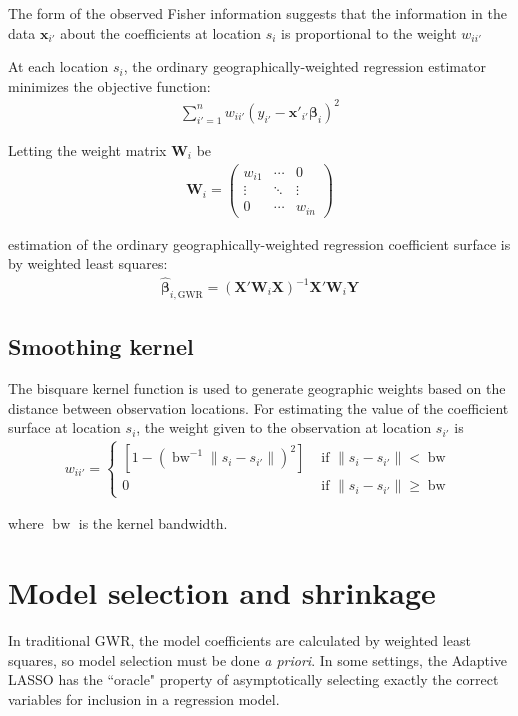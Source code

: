 \documentclass[authoryear, review, 11pt]{elsarticle}
\DeclareMathOperator*{\bw}{\mbox{bw}}
\begin{document}
	The form of the observed Fisher information suggests that the information in the data $\bm{x}_{i'}$ about the coefficients at location $s_i$ is proportional to the weight $w_{ii'}$
	
	At each location $s_i$, the ordinary geographically-weighted regression estimator minimizes the objective function:
	\begin{eqnarray}
		\sum_{i'=1}^n w_{ii'} \left(y_{i'} - \bm{x}'_{i'} \bm{\beta}_i \right)^2
	\end{eqnarray}
	
	Letting the weight matrix $\bm{W}_i$ be	
	\begin{eqnarray}
		\bm{W}_i =  \left( \begin{array}{ccc} w_{i1} & \cdots & 0 \\ \vdots & \ddots & \vdots \\ 0 & \cdots & w_{in} \end{array} \right)
	\end{eqnarray}
	
	estimation of the ordinary geographically-weighted regression coefficient surface is by weighted least squares:	
	\begin{eqnarray}
		\hat{\bm{\beta}}_{i, \mbox{GWR}} = \left( \bm{X}'\bm{W}_i\bm{X} \right)^{-1} \bm{X}'\bm{W}_i\bm{Y}
	\end{eqnarray}
	
	 
	 \subsection{Smoothing kernel}
	 	The bisquare kernel function is used to generate geographic weights based on the distance between observation locations. For estimating the value of the coefficient surface at location $s_i$, the weight given to the observation at location $s_{i'}$ is	
	\begin{eqnarray}
		w_{ii'} = \begin{cases} \left[ 1-\left( \bw^{-1} \|s_i-s_{i'}\| \right)^2 \right] & \mbox{ if } \|s_i-s_{i'}\| < \bw \\ 0 & \mbox{ if } \|s_i-s_{i'}\| \geq \bw \end{cases}
	\end{eqnarray}
	
	where $\bw$ is the kernel bandwidth.\\
	
\section{Model selection and shrinkage \label{section:method}}
	In traditional GWR, the model coefficients are calculated by weighted least squares, so model selection must be done \emph{a priori}. In some settings, the Adaptive LASSO \citep{Zou:2006} has the ``oracle" property of asymptotically selecting exactly the correct variables for inclusion in a regression model.\\
\end{document}
